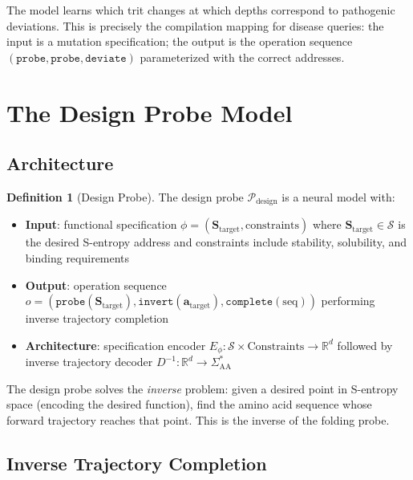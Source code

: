 \documentclass[11pt,twocolumn,a4paper]{article}
\theoremstyle{definition}
\newtheorem{definition}[theorem]{Definition}
\theoremstyle{remark}
\newcommand{\Sspace}{\mathcal{S}}
\newcommand{\Scoord}{\mathbf{S}}
\newcommand{\R}{\mathbb{R}}
\newcommand{\addr}{\mathbf{a}}
\newcommand{\probe}{\mathcal{P}}
\begin{document}
The model learns which trit changes at which depths correspond to pathogenic deviations. This is precisely the compilation mapping for disease queries: the input is a mutation specification; the output is the operation sequence $(\texttt{probe}, \texttt{probe}, \texttt{deviate})$ parameterized with the correct addresses.

\section{The Design Probe Model}
\label{sec:design_probe}

\subsection{Architecture}

\begin{definition}[Design Probe]
\label{def:design_probe}
The design probe $\probe_{\text{design}}$ is a neural model with:
\begin{itemize}
    \item \textbf{Input}: functional specification $\phi = (\Scoord_{\text{target}}, \text{constraints})$ where $\Scoord_{\text{target}} \in \Sspace$ is the desired S-entropy address and constraints include stability, solubility, and binding requirements
    \item \textbf{Output}: operation sequence $o = (\texttt{probe}(\Scoord_{\text{target}}), \texttt{invert}(\addr_{\text{target}}), \texttt{complete}(\text{seq}))$ performing inverse trajectory completion
    \item \textbf{Architecture}: specification encoder $E_\phi: \Sspace \times \text{Constraints} \to \R^d$ followed by inverse trajectory decoder $D^{-1}: \R^d \to \Sigma_{\text{AA}}^*$
\end{itemize}
\end{definition}

The design probe solves the \emph{inverse} problem: given a desired point in S-entropy space (encoding the desired function), find the amino acid sequence whose forward trajectory reaches that point. This is the inverse of the folding probe.

\subsection{Inverse Trajectory Completion}
\end{document}
